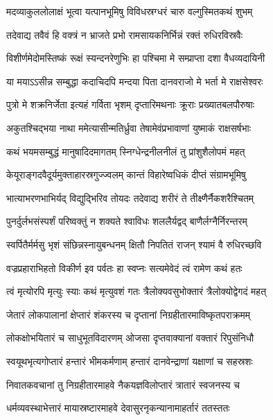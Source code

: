 \twolineshloka
{मदव्याकुललोलाक्षं भूत्वा यत्पानभूमिषु}
{विविधस्रग्धरं चारु वल्गुस्मितकथं शुभम्} %

\twolineshloka
{तदेवाद्य तवैवं हि वक्त्रं न भ्राजते प्रभो}
{रामसायकनिर्भिन्नं रक्तं रुधिरविस्रवैः} %

\twolineshloka
{विशीर्णमेदोमस्तिष्कं रूक्षं स्यन्दनरेणुभिः}
{हा पश्चिमा मे सम्प्राप्ता दशा वैधव्यदायिनी} %

\twolineshloka
{या मयाऽऽसीन्न सम्बुद्धा कदाचिदपि मन्दया}
{पिता दानवराजो मे भर्ता मे राक्षसेश्वरः} %

\twolineshloka
{पुत्रो मे शक्रनिर्जेता इत्यहं गर्विता भृशम्}
{दृप्तारिमथनाः क्रूराः प्रख्यातबलपौरुषाः} %

\twolineshloka
{अकुतश्चिद्भया नाथा ममेत्यासीन्मतिर्ध्रुवा}
{तेषामेवंप्रभावाणां युष्माकं राक्षसर्षभाः} %

\twolineshloka
{कथं भयमसम्बुद्धं मानुषादिदमागतम्}
{स्निग्धेन्द्रनीलनीलं तु प्रांशुशैलोपमं महत्} %

\twolineshloka
{केयूराङ्गदवैदूर्यमुक्ताहारस्रगुज्ज्वलम्}
{कान्तं विहारेष्वधिकं दीप्तं संग्रामभूमिषु} %

\twolineshloka
{भात्याभरणभाभिर्यद् विद्युद्भिरिव तोयदः}
{तदेवाद्य शरीरं ते तीक्ष्णैर्नैकशरैश्चितम्} %

\twolineshloka
{पुनर्दुर्लभसंस्पर्शं परिष्वक्तुं न शक्यते}
{श्वाविधः शललैर्यद्वद् बाणैर्लग्नैर्निरन्तरम्} %

\twolineshloka
{स्वर्पितैर्मर्मसु भृशं संछिन्नस्नायुबन्धनम्}
{क्षितौ निपतितं राजन् श्यामं वै रुधिरच्छवि} %

\twolineshloka
{वज्रप्रहाराभिहतो विकीर्ण इव पर्वतः}
{हा स्वप्नः सत्यमेवेदं त्वं रामेण कथं हतः} %

\twolineshloka
{त्वं मृत्योरपि मृत्युः स्याः कथं मृत्युवशं गतः}
{त्रैलोक्यवसुभोक्तारं त्रैलोक्योद्वेगदं महत्} %

\twolineshloka
{जेतारं लोकपालानां क्षेप्तारं शंकरस्य च}
{दृप्तानां निग्रहीतारमाविष्कृतपराक्रमम्} %

\twolineshloka
{लोकक्षोभयितारं च साधुभूतविदारणम्}
{ओजसा दृप्तवाक्यानां वक्तारं रिपुसंनिधौ} %

\twolineshloka
{स्वयूथभृत्यगोप्तारं हन्तारं भीमकर्मणाम्}
{हन्तारं दानवेन्द्राणां यक्षाणां च सहस्रशः} %

\twolineshloka
{निवातकवचानां तु निग्रहीतारमाहवे}
{नैकयज्ञविलोप्तारं त्रातारं स्वजनस्य च} %

\twolineshloka
{धर्मव्यवस्थाभेत्तारं मायास्रष्टारमाहवे}
{देवासुरनृकन्यानामाहर्तारं ततस्ततः} %

